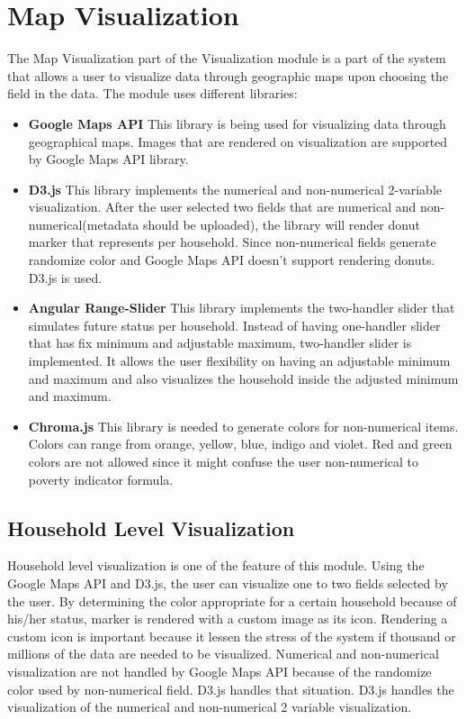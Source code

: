 \section{Map Visualization}
The Map Visualization part of the Visualization module is a part of the system that allows a user to visualize data through geographic maps upon choosing the field in the data. The module uses different libraries: 
\begin{itemize}
	\item \textbf{Google Maps API}
	This library is being used for visualizing data through geographical maps. Images that are rendered on visualization are supported by Google Maps API library. 
	\item \textbf{D3.js}
	This library implements the numerical and non-numerical 2-variable visualization. After the user selected two fields that are numerical and non-numerical(metadata should be uploaded), the library will render donut marker that represents per household. Since non-numerical fields generate randomize color and Google Maps API doesn't support rendering donuts. D3.js is used. 
	
	\item \textbf{Angular Range-Slider}
	This library implements the two-handler slider that simulates future status per household. Instead of having one-handler slider that has fix minimum and adjustable maximum, two-handler slider is implemented. It allows the user flexibility on having an adjustable minimum and maximum and also visualizes the household inside the adjusted minimum and maximum. 
	
	\item \textbf{Chroma.js}
	This library is needed to generate colors for non-numerical items. Colors can range from orange, yellow, blue, indigo and violet. Red and green colors are not allowed since it might confuse the user non-numerical to poverty indicator formula.
\end{itemize}
\subsection{Household Level Visualization}
Household level visualization is one of the feature of this module. Using the Google Maps API and D3.js, the user can visualize one to two fields selected by the user. By determining the color appropriate for a certain household because of his/her status, marker is rendered with a custom image as its icon. Rendering a custom icon is important because it lessen the stress of the system if thousand or millions of the data are needed to be visualized. Numerical and non-numerical visualization are not handled by Google Maps API because of the randomize color used by non-numerical field. D3.js handles that situation. D3.js handles the visualization of the numerical and non-numerical 2 variable visualization.

